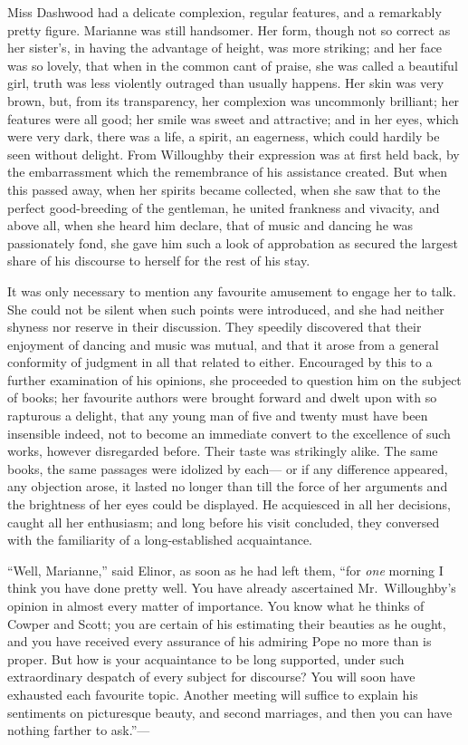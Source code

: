 \documentclass{article}
\begin{document}
Miss Dashwood had a delicate complexion,
regular features, and a remarkably pretty figure.
Marianne was still handsomer.  Her form, though not so
correct as her sister's, in having the advantage of height,
was more striking; and her face was so lovely, that when
in the common cant of praise, she was called a beautiful girl,
truth was less violently outraged than usually happens.
Her skin was very brown, but, from its transparency,
her complexion was uncommonly brilliant; her features
were all good; her smile was sweet and attractive;
and in her eyes, which were very dark, there was a life,
a spirit, an eagerness, which could hardily be seen
without delight.  From Willoughby their expression was at
first held back, by the embarrassment which the remembrance
of his assistance created.  But when this passed away,
when her spirits became collected, when she saw that to the
perfect good-breeding of the gentleman, he united frankness
and vivacity, and above all, when she heard him declare,
that of music and dancing he was passionately fond,
she gave him such a look of approbation as secured the
largest share of his discourse to herself for the rest
of his stay.

It was only necessary to mention any favourite
amusement to engage her to talk.  She could not be
silent when such points were introduced, and she
had neither shyness nor reserve in their discussion.
They speedily discovered that their enjoyment of dancing
and music was mutual, and that it arose from a general
conformity of judgment in all that related to either.
Encouraged by this to a further examination of his opinions,
she proceeded to question him on the subject of books;
her favourite authors were brought forward and dwelt
upon with so rapturous a delight, that any young man of
five and twenty must have been insensible indeed, not to
become an immediate convert to the excellence of such works,
however disregarded before.  Their taste was strikingly alike.
The same books, the same passages were idolized by each---%
or if any difference appeared, any objection arose,
it lasted no longer than till the force of her arguments
and the brightness of her eyes could be displayed.
He acquiesced in all her decisions, caught all her enthusiasm;
and long before his visit concluded, they conversed
with the familiarity of a long-established acquaintance.

``Well, Marianne,'' said Elinor, as soon as he had left them,
``for \emph{one} morning I think you have done pretty well.
You have already ascertained Mr.\ Willoughby's opinion in
almost every matter of importance.  You know what he thinks
of Cowper and Scott; you are certain of his estimating
their beauties as he ought, and you have received every
assurance of his admiring Pope no more than is proper.
But how is your acquaintance to be long supported, under such
extraordinary despatch of every subject for discourse?
You will soon have exhausted each favourite topic.
Another meeting will suffice to explain his sentiments
on picturesque beauty, and second marriages, and then
you can have nothing farther to ask.''---%
\end{document}
